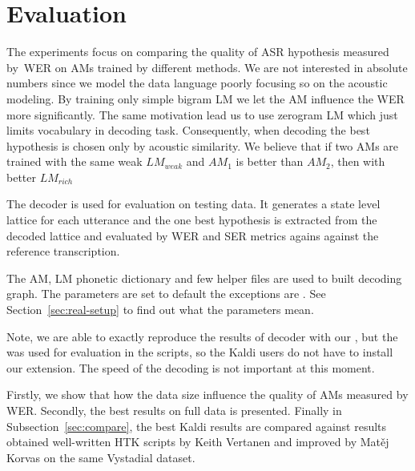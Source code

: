 \section{Evaluation}
\label{sec:am_eval}

The experiments focus on comparing the quality of ASR hypothesis measured by~\ac{WER} on \acp{AM} trained by different methods.
We are not interested in absolute numbers since we model the data language poorly focusing so on the acoustic modeling.
By training only simple bigram \ac{LM} we let the \ac{AM} influence the \ac{WER} more significantly. 
The same motivation lead us to use zerogram \ac{LM} which just limits vocabulary in decoding task.
Consequently, when decoding the best hypothesis is chosen only by acoustic similarity.
We believe that if two \acp{AM} are trained with the same weak $LM_{weak}$ and $AM_1$ is better than $AM_2$, then with better $LM_{rich}$ 


The  decoder is used for evaluation on testing data.
It generates a state level lattice for each utterance and the one best hypothesis is extracted from the decoded lattice and evaluated by \ac{WER} and \ac{SER} metrics agains against the reference transcription.

The \ac{AM}, \ac{LM} phonetic dictionary and few helper files are used to built  decoding graph.
The parameters are set to default the exceptions are . See Section~\ref{sec:real-setup} to find out what the parameters mean.

Note, we are able to exactly reproduce the results of  decoder with our , but the  was used for evaluation in the scripts, so the Kaldi users do not have to install our extension.
The speed of the decoding is not important at this moment. 

Firstly, we show that how the data size influence the quality of \acp{AM} measured by \ac{WER}.
Secondly,  the best results on full data is presented.
Finally in Subsection~\ref{sec:compare}, the best Kaldi results are compared against results obtained well-written \ac{HTK} scripts by Keith Vertanen and improved by Matěj Korvas \cite{korvas_2014} on the same Vystadial dataset.


